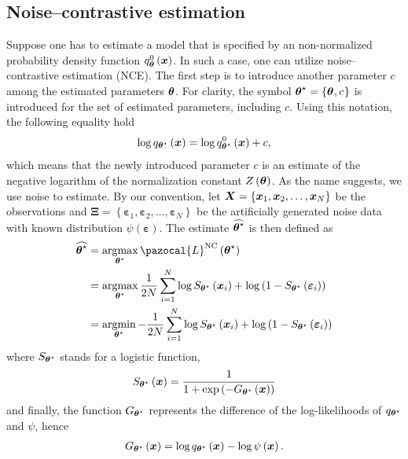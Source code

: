 \subsection{Noise--contrastive estimation}
Suppose one has to estimate a model that is specified by an non-normalized probability density function $q^0_{\boldsymbol{\theta}}\left(\boldsymbol{x}\right)$. In such a case, one can utilize noise--contrastive estimation (NCE). The first step is to introduce another parameter $c$ among the estimated parameters $\boldsymbol{\theta}$. For clarity, the symbol $\boldsymbol{\theta}^\star=\left\lbrace\boldsymbol{\theta}^{},c^{}_{}\right\rbrace$ is introduced for the set of estimated parameters, including
$c$. Using this notation, the following equality hold
\begin{align}
    \log q_{\boldsymbol{\theta}^\star}\left(\boldsymbol{x}\right) = \log q_{\boldsymbol{\theta}^\star}^0\left(\boldsymbol{x}\right) + c,
    \end{align}
which means that the newly introduced parameter $c$ is an estimate of the negative logarithm of
the normalization constant $Z\left(\boldsymbol{\theta}\right)$.
As the name suggests, we use noise to estimate. By our convention, let $\boldsymbol{X} = \left\lbrace\boldsymbol{x}_1,\boldsymbol{x}_2,\dots,\boldsymbol{x}_N\right\rbrace$
be the observations and $\boldsymbol{\Xi} = \left\lbrace\boldsymbol{\varepsilon}_1,\boldsymbol{\varepsilon}_2,\dots,\boldsymbol{\varepsilon}_N\right\rbrace$ be the artificially generated noise data with known distribution $\psi\left(\boldsymbol{\varepsilon}\right)$. The estimate $\widehat{\boldsymbol{\theta}^\star}$ is then defined as
\begin{align}
    \widehat{\bt^\star} &= \argmax_{\bt^\star} \pazocal{L}^{\mathrm{NC}}\left(\bt^\star\right)\\
   &= \argmax_{\bt^\star} \frac{1}{2N}\sum_{i=1}^N \log S_{\bt^\star}\left(\bx_i\right) + \log\left(1-S_{\bt^\star}\left(\boldsymbol{\varepsilon}_i\right) \right)\label{NCEloss1}\\
   &= \argmin_{\bt^\star} -\frac{1}{2N}\sum_{i=1}^N \log S_{\bt^\star}\left(\bx_i\right) + \log\left(1-S_{\bt^\star}\left(\boldsymbol{\varepsilon}_i\right) \right)\label{NCEloss2}
\end{align}
where $S_{\boldsymbol{\theta}^\star}$ stands for a logistic function,
\begin{align}
S_{\boldsymbol{\theta}^\star}\left(\boldsymbol{x}\right) = \frac{1}{1 + \exp\left(-G_{\boldsymbol{\theta}^\star}\left(\boldsymbol{x}\right) \right)}
\end{align}
and finally, the function $G_{\boldsymbol{\theta}^\star}$ represents the difference of the log-likelihoods of $q_{\boldsymbol{\theta}^\star}$ and $\psi$, hence 
\begin{align}\label{eq:NCE_G}
    G_{\boldsymbol{\theta}^\star}\left(\boldsymbol{x}\right) = \log q_{\boldsymbol{\theta}^\star}\left(\boldsymbol{x} \right) - \log\psi\left(\boldsymbol{x} \right).
\end{align}
